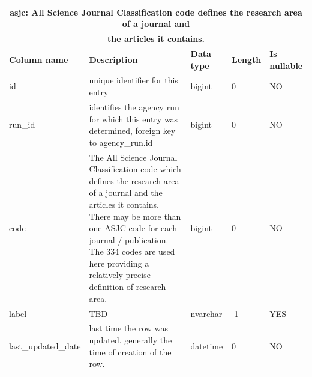 \documentclass[titlepage, 11pt]{article}
\begin{document}
{\begin{table}[h!]
{\begin{tabularx}{1\textwidth} {|p{3cm}|p{5.33cm}|p{2cm}|p{2cm}|p{2cm}|}
\end{tabularx}
\label{table: appendix b - agency run}
}
\end{table}

\begin{table}[h!]

{\renewcommand{\arraystretch}{1.5}%
\begin{tabularx}{1\textwidth}{|p{3cm}|p{5.33cm}|p{2cm}|p{2cm}|p{2cm}|}
 \hline
 \multicolumn{5}{|c|}{\textbf{asjc: All Science Journal Classification code defines the research area of a journal and }}\\
\multicolumn{5}{|c|}{\textbf{the articles it contains.}}\\

 
 \hline
 \textbf{Column name} & \textbf{Description} & \textbf{Data type} & \textbf{Length} & \textbf{Is nullable} \\
 \hline
 id  & unique identifier for this entry & bigint & 0 & NO \\
 \hline
 run\_id & identifies the agency run for which this entry was determined, foreign key to agency\_run.id & bigint & 0 & NO \\
 \hline
 code & The All Science Journal Classification code which defines the research area of a journal and the articles it contains. There may be more than one ASJC code for each journal / publication. The 334 codes are used here providing a relatively precise definition of research area. & bigint & 0 & NO \\
 \hline
 label & TBD & nvarchar & -1 & YES \\
 \hline
 last\_updated\_date & last time the row was updated. generally the time of creation of the row. & datetime & 0 & NO \\
 \hline

\end{tabularx}
\label{table: appendix b - asjc}
}
\end{table}
\begin{table}[h!]


\end{table}}
\end{document}
